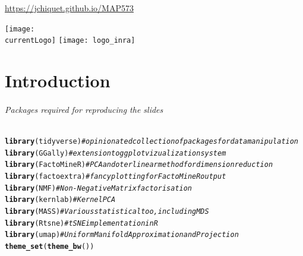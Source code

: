 \documentclass{beamer}\usepackage[]{graphicx}\usepackage[]{color}
\title{\currentCourse}
\subtitle{\huge\currentChapter\normalsize}
\institute{\currentInstitute}
\date{\currentDate}
\makeatletter
\newcommand{\hlcom}[1]{\textcolor[rgb]{0.678,0.584,0.686}{\textit{#1}}}%
\newcommand{\hlstd}[1]{\textcolor[rgb]{0.345,0.345,0.345}{#1}}%
\newcommand{\hlkwd}[1]{\textcolor[rgb]{0.737,0.353,0.396}{\textbf{#1}}}%
\newenvironment{kframe}{%
 \def\at@end@of@kframe{}%
 \ifinner\ifhmode%
  \def\at@end@of@kframe{\end{minipage}}%
  \begin{minipage}{\columnwidth}%
 \fi\fi%
 \def\FrameCommand##1{\hskip\@totalleftmargin \hskip-\fboxsep
 \colorbox{shadecolor}{##1}\hskip-\fboxsep
     \hskip-\linewidth \hskip-\@totalleftmargin \hskip\columnwidth}%
 \MakeFramed {\advance\hsize-\width
   \@totalleftmargin\z@ \linewidth\hsize
   \@setminipage}}%
 {\par\unskip\endMakeFramed%
 \at@end@of@kframe}
\newenvironment{knitrout}{}{} %
\def\currentLogo{../common_figs/logo_X}
\newcommand{\dotitlepage}{%
  \begin{frame}
    \titlepage
    \vfill
    \begin{center}
        \scriptsize\url{https://jchiquet.github.io/MAP573}
    \end{center}
    \vfill
    \texttt{[image: \\currentLogo]}\hfill
    \texttt{[image: logo\_inra]}
  \end{frame}
}
\makeatother
\begin{document}
\dotitlepage

\part{Introduction}

\begin{frame}[fragile]
  \partpage

\paragraph{Packages required for reproducing the slides}
\begin{knitrout}\scriptsize
{}\color{fgcolor}\begin{kframe}
\begin{alltt}
\hlkwd{library}\hlstd{(tidyverse)}  \hlcom{# opinionated collection of packages for data manipulation}
\hlkwd{library}\hlstd{(GGally)}     \hlcom{# extension to ggplot vizualization system}
\hlkwd{library}\hlstd{(FactoMineR)} \hlcom{# PCA and oter linear method for dimension reduction}
\hlkwd{library}\hlstd{(factoextra)} \hlcom{# fancy plotting for FactoMineR output }
\hlkwd{library}\hlstd{(NMF)}        \hlcom{# Non-Negative Matrix factorisation}
\hlkwd{library}\hlstd{(kernlab)}    \hlcom{# Kernel PCA}
\hlkwd{library}\hlstd{(MASS)}       \hlcom{# Various statistical too, including MDS}
\hlkwd{library}\hlstd{(Rtsne)}      \hlcom{# tSNE implementation in R }
\hlkwd{library}\hlstd{(umap)}       \hlcom{# Uniform Manifold Approximation and Projection}
\hlkwd{theme_set}\hlstd{(}\hlkwd{theme_bw}\hlstd{())}
\end{alltt}
\end{kframe}
\end{knitrout}

\end{frame}
\end{document}

